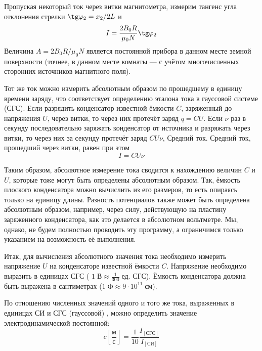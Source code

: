 Пропуская некоторый ток через витки магнитометра, измерим тангенс угла отклонения стрелки $\tg \varphi_{2} = x_{2} / 2L$ и
\[
    I = \frac{2B_{0}R}{ \mu_{0}N}\tg \varphi_{2}
\]
Величина $A=2B_{0}R/ \mu_{0}N$  является постоянной прибора в данном месте земной поверхности (точнее, в данном месте комнаты — с учётом многочисленных сторонних источников магнитного поля).

Тот же ток можно измерить абсолютным образом по прошедшему в единицу времени заряду, что соответствует определению эталона тока в гауссовой системе (СГС). Если разрядить конденсатор известной ёмкости $C$, заряженный до напряжения $U$, через витки, то через них протечёт заряд $q=CU$. Если $ \nu$ раз в секунду последовательно заряжать конденсатор от источника и разряжать через витки, то через них за секунду протечёт заряд $CU\nu$, Средний ток. Средний ток, прошедший через витки, равен при этом
\[
    I=CU\nu
\]

Таким образом, абсолютное измерение тока сводится к нахождению величин $C$ и $U$, которые тоже могут быть определены абсолютным образом. Так, ёмкость плоского конденсатора можно вычислить из его размеров, то есть опираясь только на единицу длины. Разность потенциалов также может быть определена абсолютным образом, например, через силу, действующую на пластину заряженного конденсатора, как это делается в абсолютном вольтметре. Мы, однако, не будем полностью проводить эту программу, а ограничимся только указанием на возможность её выполнения.

Итак, для вычисления абсолютного значения тока необходимо измерить напряжение $U$ на конденсаторе известной ёмкости $C$. Напряжение необходимо выразить в единицах СГС ( $1\;\text{В}\approx \frac{1}{300}\;\text{ед. СГС}$). Ёмкость конденсатора  должна быть выражена в сантиметрах ($1\;\text{Ф}\approx 9\cdot 10^{11}\;\text{см}$).

По отношению численных значений одного и того же тока, выраженных в единицах СИ и СГС (гауссовой) , можно определить значение электродинамической постоянной:
\[
    c\left[\frac{\text{м}}{\text{с}}\right] = \frac{1}{10}\frac{I_{\left[\text{СГС}\right]}}{I_{\left[\text{СИ}\right]}}
\]

